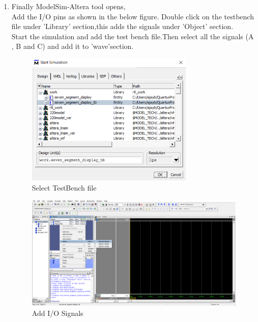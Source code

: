 \documentclass[12pt,singleside,a4paper]{article}
\begin{document}
\begin{enumerate}
        \item Finally ModelSim-Altera tool opens,\\
        Add the I/O pins as shown in the below figure.
        Double click on the testbench file under 'Library' section,this adds the signals under 'Object' section.\\
        Start the simulation and add the test bench file.Then select all the signals (A , B and C) and add it to 'wave'section.
        \begin{figure}[H]
        \centering
        \includegraphics[width=8cm,keepaspectratio]{Simulation/Simulation2.png}
        \caption{Select TestBench file}
        \end{figure}
        \begin{figure}[H]
        \centering
        \includegraphics[width=11cm,keepaspectratio]{Simulation/Simulation3.png}
        \caption{Add I/O Signals}
        \end{figure}
        

\end{enumerate}
\end{document}
